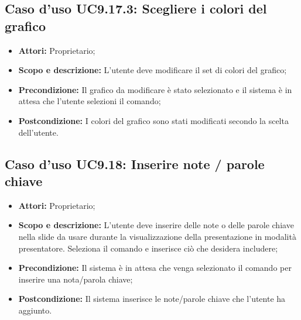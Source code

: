 		\subsection{Caso d'uso UC9.17.3: Scegliere i colori del grafico}
		\begin{itemize}
			\item \textbf{Attori:} Proprietario;
			\item \textbf{Scopo e descrizione:} L'utente deve modificare il set di colori del grafico;
			\item \textbf{Precondizione:} Il grafico da modificare è stato selezionato e il sistema è in attesa che l'utente selezioni il comando;
			\item \textbf{Postcondizione:} I colori del grafico sono stati modificati secondo la scelta dell'utente.
		\end{itemize}


\subsection{Caso d'uso UC9.18: Inserire note / parole chiave}
\begin{itemize}
	\item \textbf{Attori:} Proprietario;
	\item \textbf{Scopo e descrizione:} L'utente deve inserire delle note o delle parole chiave nella \gls{slide} da usare durante la visualizzazione della presentazione in modalità presentatore. Seleziona il comando e inserisce ciò che desidera includere;
	\item \textbf{Precondizione:} Il sistema è in attesa che venga selezionato il comando per inserire una nota/parola chiave;
	\item \textbf{Postcondizione:} Il sistema inserisce le note/parole chiave che l'utente ha aggiunto.
\end{itemize}

